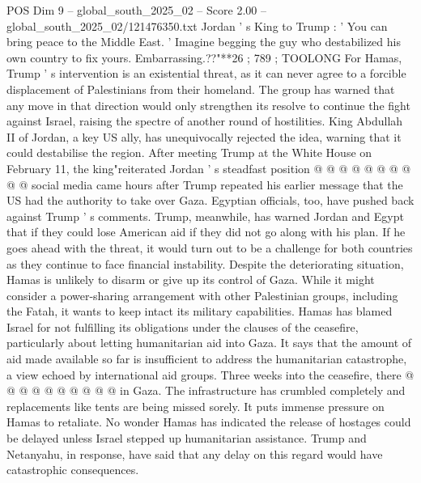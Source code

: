 \begin{textsample}{POS Dim 9 – global\_south\_2025\_02 – Score 2.00 – global\_south\_2025\_02/121476350.txt}
Jordan ' s King to Trump : ' You can bring peace to the Middle East. ' Imagine begging the guy who destabilized his own country to fix yours.
Embarrassing.??"**26 ; 789 ; TOOLONG For Hamas, Trump ' s intervention is an existential threat, as it can never agree to a forcible displacement of Palestinians from their homeland.
The group has warned that any move in that direction would only strengthen its resolve to continue the fight against Israel, raising the spectre of another round of hostilities.
King Abdullah II of Jordan, a key US ally, has unequivocally rejected the idea, warning that it could destabilise the region.
After meeting Trump at the White House on February 11, the king"reiterated Jordan ' s steadfast position @ @ @ @ @ @ @ @ @ @ social media came hours after Trump repeated his earlier message that the US had the authority to take over Gaza.
Egyptian officials, too, have pushed back against Trump ' s comments.
Trump, meanwhile, has warned Jordan and Egypt that if they could lose American aid if they did not go along with his plan.
If he goes ahead with the threat, it would turn out to be a challenge for both countries as they continue to face financial instability.
Despite the deteriorating situation, Hamas is unlikely to disarm or give up its control of Gaza.
While it might consider a power-sharing arrangement with other Palestinian groups, including the Fatah, it wants to keep intact its military capabilities.
Hamas has blamed Israel for not fulfilling its obligations under the clauses of the ceasefire, particularly about letting humanitarian aid into Gaza.
It says that the amount of aid made available so far is insufficient to address the humanitarian catastrophe, a view echoed by international aid groups.
Three weeks into the ceasefire, there @ @ @ @ @ @ @ @ @ @ in Gaza.
The infrastructure has crumbled completely and replacements like tents are being missed sorely.
It puts immense pressure on Hamas to retaliate.
No wonder Hamas has indicated the release of hostages could be delayed unless Israel stepped up humanitarian assistance.
Trump and Netanyahu, in response, have said that any delay on this regard would have catastrophic consequences.

\end{textsample}
